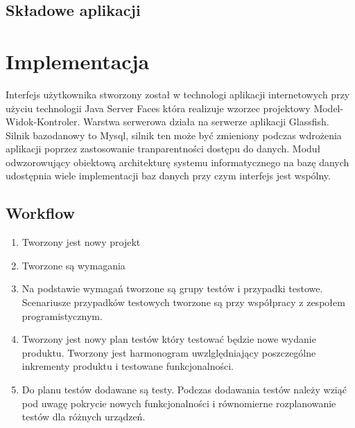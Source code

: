 \section{Składowe aplikacji}

\chapter{Implementacja}
Interfejs użytkownika stworzony został w technologi aplikacji internetowych przy użyciu technologii Java Server Faces która realizuje wzorzec projektowy  Model-Widok-Kontroler. Warstwa serwerowa działa na serwerze aplikacji Glassfish. Silnik bazodanowy to Mysql, silnik ten może być zmieniony podczas wdrożenia aplikacji poprzez zastosowanie tranparentności dostępu do danych. Moduł odwzorowujący obiektową architekturę systemu informatycznego na bazę danych udostępnia wiele implementacji baz danych przy czym interfejs jest wspólny.

\section{Workflow}
\begin{enumerate}
  \item Tworzony jest nowy projekt
  \item Tworzone są wymagania
  \item Na podstawie wymagań tworzone są grupy testów i przypadki testowe. Scenariusze przypadków testowych tworzone są przy współpracy z zespołem programistycznym.
  \item Tworzony jest nowy plan testów który testować będzie nowe wydanie produktu. Tworzony jest harmonogram uwzlględniający poszczególne inkrementy produktu i testowane funkcjonalności.
  \item Do planu testów dodawane są testy. Podczas dodawania testów należy wziąć pod uwagę pokrycie nowych funkcjonalności i równomierne rozplanowanie testów dla różnych urządzeń.

\end{enumerate}
